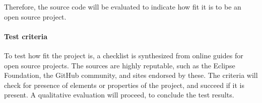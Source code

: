 Therefore, the source code will be evaluated to indicate how fit it is to be an \gls{open source} project.


\paragraph{Test criteria}
To test how fit the project is, a checklist is synthesized from online guides for open source projects.
The sources are highly reputable, such as the Eclipse Foundation, the GitHub community, and sites endorsed by these.
The criteria will check for presence of elements or properties of the project, and succeed if it is present.
A qualitative evaluation will proceed, to conclude the test results.
